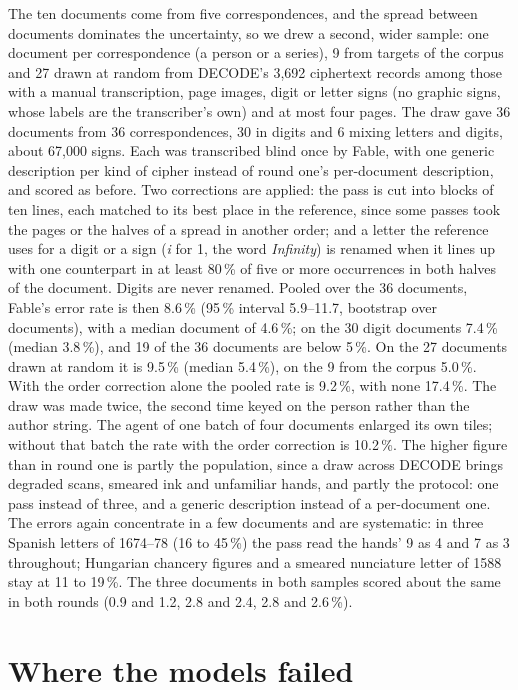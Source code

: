 \documentclass[11pt]{article}
\begin{document}
The ten documents come from five correspondences, and the spread between documents dominates the uncertainty, so we drew a second, wider sample: one document per correspondence (a person or a series), 9 from targets of the corpus and 27 drawn at random from DECODE's 3,692 ciphertext records among those with a manual transcription, page images, digit or letter signs (no graphic signs, whose labels are the transcriber's own) and at most four pages. The draw gave 36 documents from 36 correspondences, 30 in digits and 6 mixing letters and digits, about 67,000 signs. Each was transcribed blind once by Fable, with one generic description per kind of cipher instead of round one's per-document description, and scored as before. Two corrections are applied: the pass is cut into blocks of ten lines, each matched to its best place in the reference, since some passes took the pages or the halves of a spread in another order; and a letter the reference uses for a digit or a sign (\emph{i} for 1, the word \emph{Infinity}) is renamed when it lines up with one counterpart in at least 80\,\% of five or more occurrences in both halves of the document. Digits are never renamed. Pooled over the 36 documents, Fable's error rate is then 8.6\,\% (95\,\% interval 5.9--11.7, bootstrap over documents), with a median document of 4.6\,\%; on the 30 digit documents 7.4\,\% (median 3.8\,\%), and 19 of the 36 documents are below 5\,\%. On the 27 documents drawn at random it is 9.5\,\% (median 5.4\,\%), on the 9 from the corpus 5.0\,\%. With the order correction alone the pooled rate is 9.2\,\%, with none 17.4\,\%. The draw was made twice, the second time keyed on the person rather than the author string. The agent of one batch of four documents enlarged its own tiles; without that batch the rate with the order correction is 10.2\,\%. The higher figure than in round one is partly the population, since a draw across DECODE brings degraded scans, smeared ink and unfamiliar hands, and partly the protocol: one pass instead of three, and a generic description instead of a per-document one. The errors again concentrate in a few documents and are systematic: in three Spanish letters of 1674--78 (16 to 45\,\%) the pass read the hands' 9 as 4 and 7 as 3 throughout; Hungarian chancery figures and a smeared nunciature letter of 1588 stay at 11 to 19\,\%. The three documents in both samples scored about the same in both rounds (0.9 and 1.2, 2.8 and 2.4, 2.8 and 2.6\,\%).

\section{Where the models failed}
\label{sec:failures}
\end{document}
